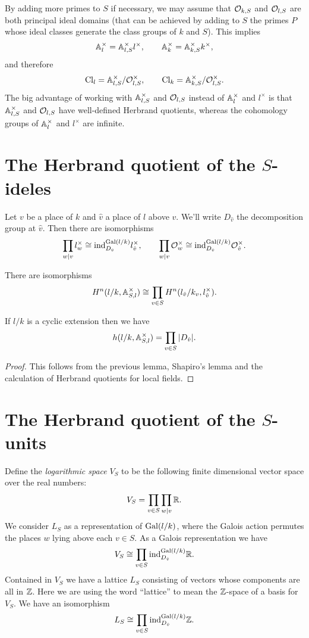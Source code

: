 By adding more primes to $S$ if necessary, we may assume that ${\mathcal O}_{k,S}$ and ${\mathcal O}_{l,S}$ are both
principal ideal domains (that can be achieved by adding to $S$ the primes $P$ whose ideal classes
generate the class groups of $k$ and $S$).
This implies
\[
	{\mathbb A}_{l}^\times = {\mathbb A}_{l,S}^\times l^\times,
	\qquad
	{\mathbb A}_k^\times = {\mathbb A}_{k,S}^\times k^\times,
\]
and therefore
\[
	\mathrm{Cl}_{l} = {\mathbb A}_{l,S}^\times / {\mathcal O}_{l,S}^\times, \qquad
	\mathrm{Cl}_{k} = {\mathbb A}_{k,S}^\times / {\mathcal O}_{l,S}^\times.
\]
The big advantage of working with ${\mathbb A}_{l,S}^\times$ and ${\mathcal O}_{l,S}$ instead of ${\mathbb A}_l^\times$ and
$l^\times$ is that ${\mathbb A}_{l,S}^\times$ and ${\mathcal O}_{l,S}$ have well-defined Herbrand quotients,
whereas the cohomology groups of ${\mathbb A}_l^\times$ and $l^\times$ are infinite.





\section{The Herbrand quotient of the $S$-ideles}

Let $v$ be a place of $k$ and $\hat v$ a place of $l$ above $v$.
We'll write $D_{\hat v}$ the decomposition group at $\hat v$.
Then there are isomorphisms
\[
	\prod_{w | v} l_w^\times
	\cong
	\mathrm{ind}_{D_{\hat v}}^{\mathrm{Gal}(l/k)} l_{\hat v}^\times,
	\qquad
	\prod_{w | v} {\mathcal O}_w^\times
	\cong
	\mathrm{ind}_{D_{\hat v}}^{\mathrm{Gal}(l/k)} {\mathcal O}_{\hat v}^\times.
\]

\begin{lemma}
	There are isomorphisms
	\[
		H^n(l/k, {\mathbb A}_{S,l} ^\times)
		\cong
		\prod_{v \in S} H^n(l_{\hat v} / k_v, l_{\hat v}^\times).
	\]
\end{lemma}

\begin{lemma}
	If $l/k$ is a cyclic extension then we have
	\[
		h(l/k, {\mathbb A}_{S,l} ^\times )
		=
		\prod_{v \in S} |D_{\hat v}|.
	\]
\end{lemma}

\begin{proof}
	This follows from the previous lemma, Shapiro's lemma and the
	calculation of Herbrand quotients for local fields.
\end{proof}



\section{The Herbrand quotient of the $S$-units}

Define the \emph{logarithmic space} $V_S$ to be the following finite dimensional vector space
over the real numbers:
\[
	V_S = \prod_{v \in S} \prod_{w | v} {\mathbb R}.
\]
We consider $L_S$ as a representation of $\mathrm{Gal}(l/k)$, where the Galois action
permutes the places $w$ lying above each $v \in S$.
As a Galois representation we have
\[
	V_S \cong \prod_{v \in S} \mathrm{ind}_{D_{\hat v}}^{\mathrm{Gal}(l/k)} {\mathbb R}.
\]
Contained in $V_S$ we have a lattice $L_S$ consisting of vectors whose components are all in ${\mathbb Z}$.
Here we are using the word ``lattice'' to mean the ${\mathbb Z}$-space of a basis for $V_S$.
We have an isomorphism
\[
	L_S \cong \prod_{v \in S} \mathrm{ind}_{D_{\hat v}}^{\mathrm{Gal}(l/k)} {\mathbb Z}.
\]

